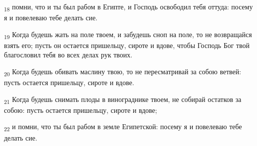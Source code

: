 \begin{tcolorbox}
\textsubscript{18} помни, что и ты был рабом в Египте, и Господь освободил тебя оттуда: посему я и повелеваю тебе делать сие.
\end{tcolorbox}
\begin{tcolorbox}
\textsubscript{19} Когда будешь жать на поле твоем, и забудешь сноп на поле, то не возвращайся взять его; пусть он остается пришельцу, сироте и вдове, чтобы Господь Бог твой благословил тебя во всех делах рук твоих.
\end{tcolorbox}
\begin{tcolorbox}
\textsubscript{20} Когда будешь обивать маслину твою, то не пересматривай за собою ветвей: пусть остается пришельцу, сироте и вдове.
\end{tcolorbox}
\begin{tcolorbox}
\textsubscript{21} Когда будешь снимать плоды в винограднике твоем, не собирай остатков за собою: пусть остается пришельцу, сироте и вдове;
\end{tcolorbox}
\begin{tcolorbox}
\textsubscript{22} и помни, что ты был рабом в земле Египетской: посему я и повелеваю тебе делать сие.
\end{tcolorbox}
